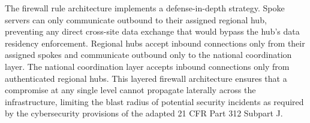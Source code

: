 The firewall rule architecture implements a defense-in-depth strategy. Spoke
servers can only communicate outbound to their assigned regional hub, preventing
any direct cross-site data exchange that would bypass the hub's data residency
enforcement. Regional hubs accept inbound connections only from their assigned
spokes and communicate outbound only to the national coordination layer. The
national coordination layer accepts inbound connections only from authenticated
regional hubs. This layered firewall architecture ensures that a compromise at
any single level cannot propagate laterally across the infrastructure, limiting
the blast radius of potential security incidents as required by the
cybersecurity provisions of the adapted 21 CFR Part 312 \cite{cfr312-adapt}
Subpart J.
